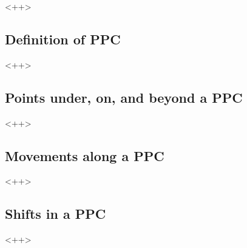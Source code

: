 \documentclass[11pt, a4paper, openany]{book}
\begin{document}
<++>

\subsection{Definition of PPC}

<++>

\subsection{Points under, on, and beyond a PPC}

<++>

\subsection{Movements along a PPC}

<++>

\subsection{Shifts in a PPC}

<++>
\end{document}
